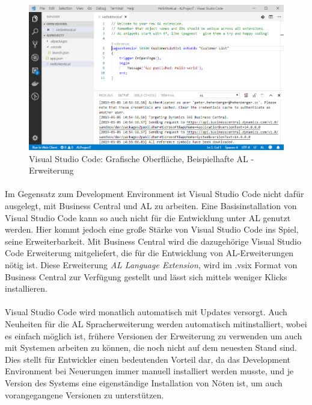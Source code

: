 \begin{figure}[h]
	\centering
	\includegraphics[width=130mm]{images/VSCode}
	\caption{Visual Studio Code: Grafische Oberfläche, Beispielhafte AL - Erweiterung}
	\label{fig:VSCodeGUI}
\end{figure}

\pagebreak
\paragraph{}
Im Gegensatz zum Development Environment ist Visual Studio Code nicht dafür ausgelegt, mit Business Central und AL zu arbeiten. Eine Basisinstallation von Visual Studio Code kann so auch nicht für die Entwicklung unter AL genutzt werden. Hier kommt jedoch eine große Stärke von Visual Studio Code ins Spiel, seine Erweiterbarkeit. Mit Business Central wird die dazugehörige Visual Studio Code Erweiterung mitgeliefert, die für die Entwicklung von AL-Erweiterungen nötig ist. Diese Erweiterung \textit{AL Language Extension}, wird im .vsix Format von Business Central zur Verfügung gestellt und lässt sich mittels weniger Klicks installieren.

\paragraph{}
Visual Studio Code wird monatlich automatisch mit Updates versorgt. Auch Neuheiten für die AL Spracherweiterung werden automatisch mitinstalliert, wobei es einfach möglich ist, frühere Versionen der Erweiterung zu verwenden um auch mit Systemen arbeiten zu können, die noch nicht auf dem neuesten Stand sind. Dies stellt für Entwickler einen bedeutenden Vorteil dar, da das Development Environment bei Neuerungen immer manuell installiert werden musste, und je Version des Systems eine eigenständige Installation von Nöten ist, um auch vorangegangene Versionen zu unterstützen.

